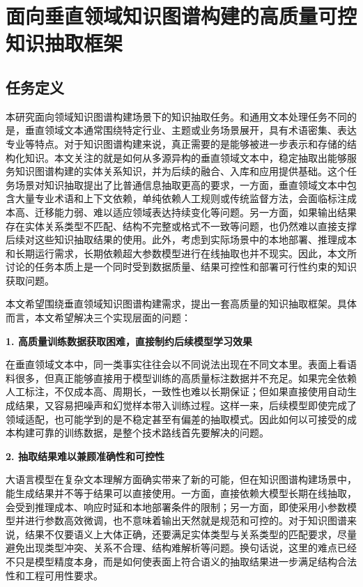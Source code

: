 
\chapter{面向垂直领域知识图谱构建的高质量可控知识抽取框架}
\label{chap:framework}

\section{任务定义}

本研究面向领域知识图谱构建场景下的知识抽取任务。和通用文本处理任务不同的是，垂直领域文本通常围绕特定行业、主题或业务场景展开，具有术语密集、表达专业等特点。对于知识图谱构建来说，真正需要的是能够被进一步表示和存储的结构化知识。本文关注的就是如何从多源异构的垂直领域文本中，稳定抽取出能够服务知识图谱构建的实体关系知识，并为后续的融合、入库和应用提供基础。这个任务场景对知识抽取提出了比普通信息抽取更高的要求，一方面，垂直领域文本中包含大量专业术语和上下文依赖，单纯依赖人工规则或传统监督方法，会面临标注成本高、迁移能力弱、难以适应领域表达持续变化等问题。另一方面，如果输出结果存在实体关系类型不匹配、结构不完整或格式不一致等问题，也仍然难以直接支撑后续对这些知识抽取结果的使用。此外，考虑到实际场景中的本地部署、推理成本和长期运行需求，长期依赖超大参数模型进行在线抽取也并不现实。因此，本文所讨论的任务本质上是一个同时受到数据质量、结果可控性和部署可行性约束的知识获取问题。

本文希望围绕垂直领域知识图谱构建需求，提出一套高质量的知识抽取框架。具体而言，本文希望解决三个实现层面的问题：

\textbf{1. 高质量训练数据获取困难，直接制约后续模型学习效果}

在垂直领域文本中，同一类事实往往会以不同说法出现在不同文本里。表面上看语料很多，但真正能够直接用于模型训练的高质量标注数据并不充足。如果完全依赖人工标注，不仅成本高、周期长，一致性也难以长期保证；但如果直接使用自动生成结果，又容易把噪声和幻觉样本带入训练过程。这样一来，后续模型即使完成了领域适配，也可能学到的是不稳定甚至有偏差的抽取模式。因此如何以可接受的成本构建可靠的训练数据，是整个技术路线首先要解决的问题。

\textbf{2. 抽取结果难以兼顾准确性和可控性}

大语言模型在复杂文本理解方面确实带来了新的可能，但在知识图谱构建场景中，能生成结果并不等于结果可以直接使用。一方面，直接依赖大模型长期在线抽取，会受到推理成本、响应时延和本地部署条件的限制；另一方面，即使采用小参数模型并进行参数高效微调，也不意味着输出天然就是规范和可控的。对于知识图谱来说，结果不仅要语义上大体正确，还要满足实体类型与关系类型的匹配要求，尽量避免出现类型冲突、关系不合理、结构难解析等问题。换句话说，这里的难点已经不只是模型精度本身，而是如何使表面上符合语义的抽取结果进一步满足结构合法性和工程可用性要求。

